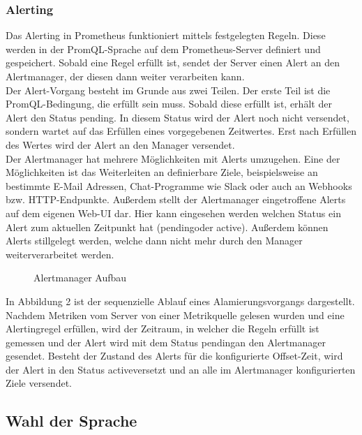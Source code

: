 \documentclass[a4paper,10pt]{scrartcl}
\begin{document}
\subsubsection{Alerting}

Das Alerting in Prometheus funktioniert mittels festgelegten Regeln. Diese werden in der PromQL-Sprache auf dem Prometheus-Server definiert und gespeichert. Sobald eine Regel erfüllt ist, sendet der Server einen Alert an den Alertmanager, der diesen dann weiter verarbeiten kann.\\
Der Alert-Vorgang besteht im Grunde aus zwei Teilen. Der erste Teil ist die PromQL-Bedingung, die erfüllt sein muss. Sobald diese erfüllt ist, erhält der Alert den Status \glqq pending\grqq. In diesem Status wird der Alert noch nicht versendet, sondern wartet auf das Erfüllen eines vorgegebenen Zeitwertes. Erst nach Erfüllen des Wertes wird der Alert an den Manager versendet.\\

Der Alertmanager hat mehrere Möglichkeiten mit Alerts umzugehen. Eine der Möglichkeiten ist das Weiterleiten an definierbare Ziele, beispielsweise an bestimmte E-Mail Adressen, Chat-Programme wie Slack oder auch an Webhooks bzw. HTTP-Endpunkte. Außerdem stellt der Alertmanager eingetroffene Alerts auf dem eigenen Web-UI dar. Hier kann eingesehen werden welchen Status ein Alert zum aktuellen Zeitpunkt hat (\glqq pending\grqq oder \glqq active\grqq). Außerdem können Alerts stillgelegt werden, welche dann nicht mehr durch den Manager weiterverarbeitet werden.\\

\begin{figure}[htbp]
  \centering
  \scalebox{.8}{}
  \caption{Alertmanager Aufbau}
\end{figure}

In Abbildung 2 ist der sequenzielle Ablauf eines Alamierungsvorgangs dargestellt. Nachdem Metriken vom Server von einer Metrikquelle gelesen wurden und eine Alertingregel erfüllen, wird der Zeitraum, in welcher die Regeln erfüllt ist gemessen und der Alert wird mit dem Status \glqq pending\grqq an den Alertmanager gesendet. Besteht der Zustand des Alerts für die konfigurierte Offset-Zeit, wird der Alert in den Status \grqq active\grqq versetzt und an alle im Alertmanager konfigurierten Ziele versendet.

\subsection{Wahl der Sprache}
\end{document}
